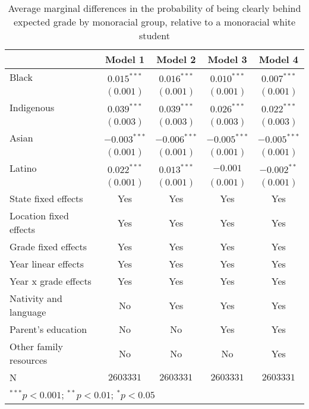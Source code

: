 \documentclass[
  12pt,
  letterpaper,
]{article}
\begin{document}
\hypertarget{tbl-monoracial}{}
\begin{table}[t]
\caption{\label{tbl-monoracial}Average marginal differences in the probability of being clearly behind
expected grade by monoracial group, relative to a monoracial white
student }
\begin{center}
\begin{tabular}{l c c c c}
\hline
 & Model 1 & Model 2 & Model 3 & Model 4 \\
\hline
Black                  & $0.015^{***}$  & $0.016^{***}$  & $0.010^{***}$  & $0.007^{***}$  \\
                       & $(0.001)$      & $(0.001)$      & $(0.001)$      & $(0.001)$      \\
Indigenous             & $0.039^{***}$  & $0.039^{***}$  & $0.026^{***}$  & $0.022^{***}$  \\
                       & $(0.003)$      & $(0.003)$      & $(0.003)$      & $(0.003)$      \\
Asian                  & $-0.003^{***}$ & $-0.006^{***}$ & $-0.005^{***}$ & $-0.005^{***}$ \\
                       & $(0.001)$      & $(0.001)$      & $(0.001)$      & $(0.001)$      \\
Latino                 & $0.022^{***}$  & $0.013^{***}$  & $-0.001$       & $-0.002^{**}$  \\
                       & $(0.001)$      & $(0.001)$      & $(0.001)$      & $(0.001)$      \\
\hline
State fixed effects    & Yes            & Yes            & Yes            & Yes            \\
Location fixed effects & Yes            & Yes            & Yes            & Yes            \\
Grade fixed effects    & Yes            & Yes            & Yes            & Yes            \\
Year linear effects    & Yes            & Yes            & Yes            & Yes            \\
Year x grade effects   & Yes            & Yes            & Yes            & Yes            \\
Nativity and language  & No             & Yes            & Yes            & Yes            \\
Parent's education     & No             & No             & Yes            & Yes            \\
Other family resources & No             & No             & No             & Yes            \\
N                      & $2603331$      & $2603331$      & $2603331$      & $2603331$      \\
\hline
\multicolumn{5}{l}{\scriptsize{$^{***}p<0.001$; $^{**}p<0.01$; $^{*}p<0.05$}}
\end{tabular}
\label{tbl-monoracial}
\end{center}
\end{table}
\end{document}
